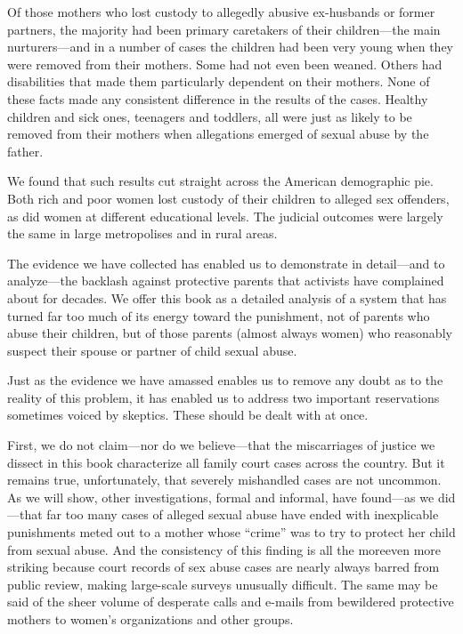 Of those mothers who lost custody to allegedly abusive ex-husbands or former partners, the majority had been primary caretakers of their children—the main nurturers—and in a number of cases the children had been very young when they were removed from their mothers. Some had not even been weaned. Others had disabilities that made them particularly dependent on their mothers. None of these facts made any consistent difference in the results of the cases. Healthy children and sick ones, teenagers and toddlers, all were just as likely to be removed from their mothers when allegations emerged of sexual abuse by the father. \pfl{}


We found that such results cut straight across the American demographic pie. Both rich and poor women lost custody of their children to alleged sex offenders, as did women at different educational levels. The judicial outcomes were largely the same in large metropolises and in rural areas. \pfl{}


The evidence we have collected has enabled us to demonstrate in detail—and to analyze—the backlash against protective parents that activists have complained about for decades. We offer this book as a detailed analysis of a system that has turned far too much of its energy toward the punishment, not of parents who abuse their children, but of those parents (almost always women) who reasonably suspect their spouse or partner of child sexual abuse. \pfl{}


Just as the evidence we have amassed enables us to remove any doubt as to the reality of this problem, it has enabled us to address two important reservations sometimes voiced by skeptics. These should be dealt with at once. \pfl{}


First, we do not claim—nor do we believe—that the miscarriages of justice we dissect in this book characterize all family court cases across the country. But it remains true, unfortunately, that severely mishandled cases are not uncommon. As we will show, other investigations, formal and informal, have found—as we did—that far too many cases of alleged sexual abuse have ended with inexplicable punishments meted out to a mother whose “crime” was to try to protect her child from sexual abuse. And the consistency of this finding is all the moreeven more striking because court records of sex abuse cases are nearly always barred from public review, making large-scale surveys unusually difficult. The same may be said of the sheer volume of desperate calls and e-mails from bewildered protective mothers to women’s organizations and other groups. \pfl{}


